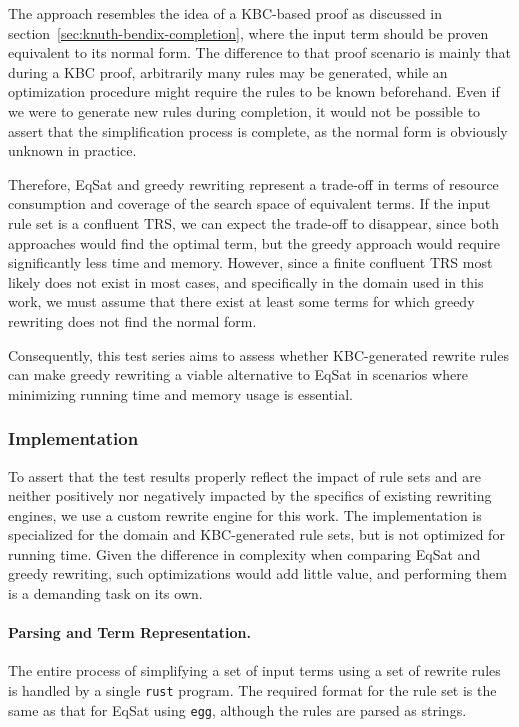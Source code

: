 The approach resembles the idea of a KBC-based proof as discussed in section~\ref{sec:knuth-bendix-completion}, where the input term should be proven equivalent to its normal form. The difference to that proof scenario is mainly that during a KBC proof, arbitrarily many rules may be generated, while an optimization procedure might require the rules to be known beforehand. Even if we were to generate new rules during completion, it would not be possible to assert that the simplification process is complete, as the normal form is obviously unknown in practice.

Therefore, EqSat and greedy rewriting represent a trade-off in terms of resource consumption and coverage of the search space of equivalent terms. If the input rule set is a confluent TRS, we can expect the trade-off to disappear, since both approaches would find the optimal term, but the greedy approach would require significantly less time and memory. However, since a finite confluent TRS most likely does not exist in most cases, and specifically in the domain used in this work, we must assume that there exist at least some terms for which greedy rewriting does not find the normal form.

Consequently, this test series aims to assess whether KBC-generated rewrite rules can make greedy rewriting a viable alternative to EqSat in scenarios where minimizing running time and memory usage is essential.

\subsubsection{Implementation}
To assert that the test results properly reflect the impact of rule sets and are neither positively nor negatively impacted by the specifics of existing rewriting engines, we use a custom rewrite engine for this work. The implementation is specialized for the domain and KBC-generated rule sets, but is not optimized for running time. Given the difference in complexity when comparing EqSat and greedy rewriting, such optimizations would add little value, and performing them is a demanding task on its own.

\paragraph{Parsing and Term Representation.}
The entire process of simplifying a set of input terms using a set of rewrite rules is handled by a single \texttt{rust} program. The required format for the rule set is the same as that for EqSat using \texttt{egg}, although the rules are parsed as strings. 

